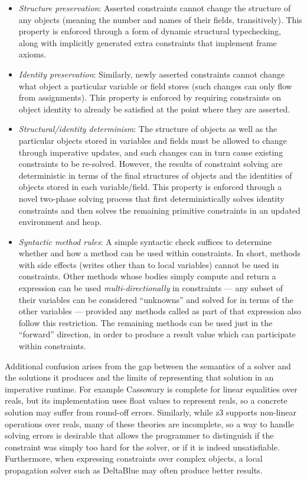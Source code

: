 \begin{itemize}
\item {\em Structure preservation}: Asserted constraints cannot change the
  structure of any objects (meaning the number and names of their fields,
  transitively).  This property is enforced through a form of dynamic structural
  typechecking, along with implicitly generated extra constraints that implement
  frame axioms.
\item {\em Identity preservation}: Similarly, newly asserted
  constraints cannot change what object a particular variable or field
  stores (such changes can only flow from assignments).  This property
  is enforced by requiring constraints on object identity to already
  be satisfied at the point where they are asserted.
\item {\em Structural/identity determinism}: The structure of objects
  as well as the particular objects stored in variables and fields
  must be allowed to change through imperative updates, and such
  changes can in turn cause existing constraints to be re-solved.
  However, the results of constraint solving are deterministic in
  terms of the final structures of objects and the identities of
  objects stored in each variable/field.  This property is enforced
  through a novel two-phase solving process that first
  deterministically solves identity constraints and then solves the
  remaining primitive constraints in an updated environment and heap.
\item {\em Syntactic method rules}: A simple syntactic check suffices
  to determine whether and how a method can be used within
  constraints.  In short, methods with side effects (writes other than
  to local variables) cannot be used in constraints.  Other methods
  whose bodies simply compute and return a expression can be used {\em
    multi-directionally} in constraints --- any subset of their
  variables can be considered ``unknowns'' and solved for in terms of
  the other variables --- provided any methods called as part of that
  expression also follow this restriction. The remaining methods can
  be used just in the ``forward'' direction, in order to produce a
  result value which can participate within constraints.
\end{itemize}

Additional confusion arises from the gap between the semantics of a
solver and the solutions it produces and the limits of representing
that solution in an imperative runtime. For example Cassowary is
complete for linear equalities over reals, but its implementation uses
float values to represent reals, so a concrete solution may suffer
from round-off errors. Similarly, while \gls{z3} supports non-linear
operations over reals, many of these theories are incomplete, so a way
to handle solving errors is desirable that allows the programmer to
distinguish if the constraint was simply too hard for the solver, or
if it is indeed unsatisfiable. Furthermore, when expressing
constraints over complex objects, a local propagation solver such as
DeltaBlue may often produce better results.

